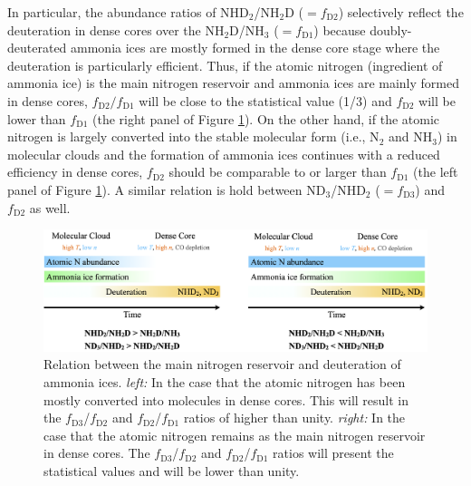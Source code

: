 \documentclass[12pt,a4paper]{article}  %
\begin{document}
In particular, the abundance ratios of NHD$_2$/NH$_2$D ($=f_\mathrm{D2}$) selectively reflect the deuteration in dense cores over the NH$_2$D/NH$_3$ ($=f_\mathrm{D1}$) because doubly-deuterated ammonia ices are mostly formed in the dense core stage where the deuteration is particularly efficient. Thus, if the atomic nitrogen (ingredient of ammonia ice) is the main nitrogen reservoir and ammonia ices are mainly formed in dense cores, $f_\mathrm{D2}/f_\mathrm{D1}$ will be close to the statistical value (1/3) and $f_\mathrm{D2}$ will be lower than $f_\mathrm{D1}$ (the right panel of Figure \ref{fig:ammonia_deuteration}). On the other hand, if the atomic nitrogen is largely converted into the stable molecular form (i.e., N$_2$ and NH$_3$) in molecular clouds and the formation of ammonia ices continues with a reduced efficiency in dense cores, $f_\mathrm{D2}$ should be comparable to or larger than $f_\mathrm{D1}$ (the left panel of Figure \ref{fig:ammonia_deuteration}). A similar relation is hold between ND$_3$/NHD$_2$ ($=f_\mathrm{D3}$) and $f_\mathrm{D2}$ as well.  



\begin{figure}[th]
    \centering
    \includegraphics[width=\textwidth]{ammonia_deuteration_cartoon_no_schemfig.png}
    \caption{Relation between the main nitrogen reservoir and deuteration of ammonia ices. \textit{left:} In the case that the atomic nitrogen has been mostly converted into molecules in dense cores. This will result in the $f_\mathrm{D3}$/$f_\mathrm{D2}$ and $f_\mathrm{D2}$/$f_\mathrm{D1}$ ratios of higher than unity. \textit{right:} In the case that the atomic nitrogen remains as the main nitrogen reservoir in dense cores. The $f_\mathrm{D3}$/$f_\mathrm{D2}$ and $f_\mathrm{D2}$/$f_\mathrm{D1}$ ratios will present the statistical values and will be lower than unity.}
    \label{fig:ammonia_deuteration}
\end{figure}
\end{document}
